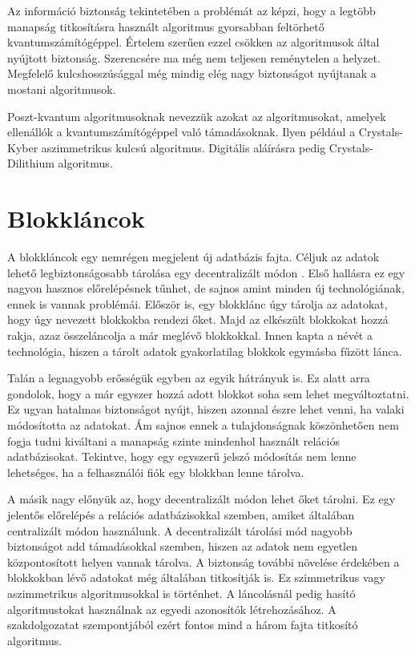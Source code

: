 \documentclass[12pt]{report} %
\begin{document}
Az információ biztonság tekintetében a problémát az képzi, hogy a legtöbb manapság titkosításra használt algoritmus gyorsabban feltörhető kvantumszámítógéppel. Értelem szerűen ezzel csökken az algoritmusok által nyújtott biztonság. Szerencsére ma még nem teljesen reménytelen a helyzet. Megfelelő kulcshosszúsággal még mindig elég nagy biztonságot nyújtanak a mostani algoritmusok.

Poszt-kvantum algoritmusoknak nevezzük azokat az algoritmusokat, amelyek ellenállók a kvantumszámítógéppel való támadásoknak. Ilyen például a Crystals-Kyber aszimmetrikus kulcsú algoritmus. Digitális aláírásra pedig Crystals-Dilithium algoritmus.

\section{Blokkláncok} %

A blokkláncok egy nemrégen megjelent új adatbázis fajta. Céljuk az adatok lehető legbiztonságosabb tárolása egy decentralizált módon \cite{daglarCizmeciBlockchain}. Első hallásra ez egy nagyon hasznos előrelépésnek tűnhet, de sajnos amint minden új technológiának, ennek is vannak problémái. Először is, egy blokklánc úgy tárolja az adatokat, hogy úgy nevezett blokkokba rendezi őket. Majd az elkészült blokkokat hozzá rakja, azaz összeláncolja a már meglévő blokkokkal. Innen kapta a névét a technológia, hiszen a tárolt adatok gyakorlatilag blokkok egymásba fűzött lánca.

Talán a legnagyobb erősségük egyben az egyik hátrányuk is. Ez alatt arra gondolok, hogy a már egyszer hozzá adott blokkot soha sem lehet megváltoztatni. Ez ugyan hatalmas biztonságot nyújt, hiszen azonnal észre lehet venni, ha valaki módosította az adatokat. Ám sajnos ennek a tulajdonságnak köszönhetően nem fogja tudni kiváltani a manapság szinte mindenhol használt relációs adatbázisokat. Tekintve, hogy egy egyszerű jelszó módosítás nem lenne lehetséges, ha a felhasználói fiók egy blokkban lenne tárolva.

A másik nagy előnyük az, hogy decentralizált módon lehet őket tárolni. Ez egy jelentős előrelépés a relációs adatbázisokkal szemben, amiket általában centralizált módon használunk. A decentralizált tárolási mód nagyobb biztonságot add támadásokkal szemben, hiszen az adatok nem egyetlen központosított helyen vannak tárolva. A biztonság további növelése érdekében a blokkokban lévő adatokat még általában titkosítják is. Ez szimmetrikus vagy aszimmetrikus algoritmusokkal is történhet. A láncolásnál pedig hasító algoritmustokat használnak az egyedi azonosítók létrehozásához. A szakdolgozatat szempontjából ezért fontos mind a három fajta titkosító algoritmus.
\end{document}
